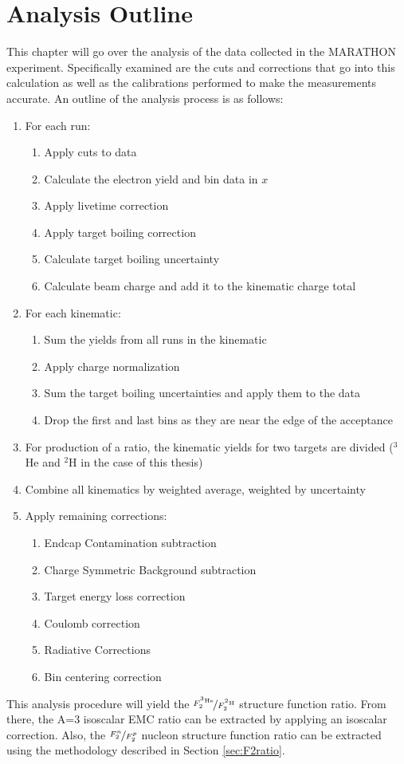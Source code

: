\section{Analysis Outline}
\label{sec:analysis_outline}
This chapter will go over the analysis of the data collected in the MARATHON experiment. Specifically examined are the cuts and corrections that go into this calculation as well as the calibrations performed to make the measurements accurate. An outline of the analysis process is as follows:
\renewcommand{\labelenumii}{\roman{enumii}.}
\begin{enumerate}
	\item For each run:
	\begin{enumerate}
		\item Apply cuts to data
		\item Calculate the electron yield and bin data in $x$
		\item Apply livetime correction
		\item Apply target boiling correction
		\item Calculate target boiling uncertainty
		\item Calculate beam charge and add it to the kinematic charge total
	\end{enumerate}
	\item For each kinematic:
	\begin{enumerate}
		\item Sum the yields from all runs in the kinematic
		\item Apply charge normalization
		\item Sum the target boiling uncertainties and apply them to the data
		\item Drop the first and last bins as they are near the edge of the acceptance
	\end{enumerate}
	\item For production of a ratio, the kinematic yields for two targets are divided ($^3$He and $^2$H in the case of this thesis)
	\item Combine all kinematics by weighted average, weighted by uncertainty
	\item Apply remaining corrections:
	\begin{enumerate}
		\item Endcap Contamination subtraction
		\item Charge Symmetric Background subtraction
		\item Target energy loss correction
		\item Coulomb correction
		\item Radiative Corrections
		\item Bin centering correction
	\end{enumerate}
\end{enumerate}
This analysis procedure will yield the $\nicefrac{F_2^{^3\textrm{He}}}{F_2^{^2\textrm{H}}}$ structure function ratio. From there, the A=3 isoscalar EMC ratio can be extracted by applying an isoscalar correction. Also, the $\nicefrac{F_2^n}{F_2^p}$ nucleon structure function ratio can be extracted using the methodology described in Section \ref{sec:F2ratio}.

